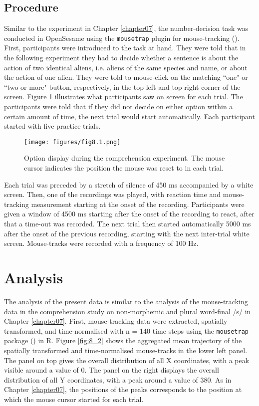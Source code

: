 \subsection{Procedure}\label{section08_1_3}

Similar to the experiment in Chapter \ref{chapter07}, the number-decision task was conducted in OpenSesame using the \texttt{mousetrap} plugin for mouse-tracking (\cite{Kieslich2017}). First, participants were introduced to the task at hand. They were told that in the following experiment they had to decide whether a sentence is about the action of two identical aliens, i.e. aliens of the same species and name, or about the action of one alien. They were told to mouse-click on the matching ``one" or ``two or more" button, respectively, in the top left and top right corner of the screen. Figure \ref{fig:8_1} illustrates what participants saw on screen for each trial. The participants were told that if they did not decide on either option within a certain amount of time, the next trial would start automatically. Each participant started with five practice trials.

\begin{figure}[b]
    \centering
    \texttt{[image: figures/fig8.1.png]}
    \caption{Option display during the comprehension experiment. The mouse cursor indicates the position the mouse was reset to in each trial.}
    \label{fig:8_1}
\end{figure}

Each trial was preceded by a stretch of silence of 450 ms accompanied by a white screen. Then, one of the recordings was played, with reaction time and mouse-tracking measurement starting at the onset of the recording. Participants were given a window of 4500 ms starting after the onset of the recording to react, after that a time-out was recorded. The next trial then started automatically 5000 ms after the onset of the previous recording, starting with the next inter-trial white screen. Mouse-tracks were recorded with a frequency of 100 Hz.

\section{Analysis}\label{section08_2}

The analysis of the present data is similar to the analysis of the mouse-tracking data in the comprehension study on non-morphemic and plural word-final /s/ in Chapter \ref{chapter07}. First, mouse-tracking data were extracted, spatially transformed, and time-normalised with n = 140 time steps using the \texttt{mousetrap} package (\cite{Kieslich2019}) in R. Figure \ref{fig:8_2} shows the aggregated mean trajectory of the spatially transformed and time-normalised mouse-tracks in the lower left panel. The panel on top gives the overall distribution of all X coordinates, with a peak visible around a value of $0$. The panel on the right displays the overall distribution of all Y coordinates, with a peak around a value of $380$. As in Chapter \ref{chapter07}, the positions of the peaks corresponds to the position at which the mouse cursor started for each trial.

